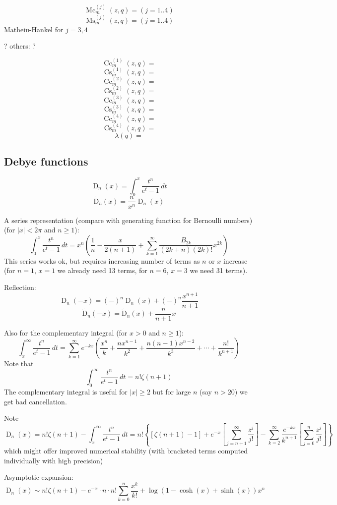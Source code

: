 \documentclass[10pt,dvipdfmx,letterpaper,twoside]{article}
\let\O=\operatorname
\newenvironment{implementation}{\noindent\begin{framed}}{\end{framed}}
\begin{document}
\[ \O{Mc}^{(j)}_m(z,q) = (j=1..4)\]
\[ \O{Ms}^{(j)}_m(z,q) = (j=1..4)\]
Matheiu-Hankel for $j=3,4$

? others: ?

\[ \O{Cc}^{(1)}_m(z,q) = \]
\[ \O{Cs}^{(1)}_m(z,q) = \]
\[ \O{Cc}^{(2)}_m(z,q) = \]
\[ \O{Cs}^{(2)}_m(z,q) = \]
\[ \O{Cc}^{(3)}_m(z,q) = \]
\[ \O{Cs}^{(3)}_m(z,q) = \]
\[ \O{Cc}^{(4)}_m(z,q) = \]
\[ \O{Cs}^{(4)}_m(z,q) = \]
\[ \lambda(q) = \]

\subsection{Debye functions}
\[ \O{D}_n(x) = \int_0^x\frac{t^n}{e^t-1}\,dt \]
\[ \O{\widetilde{D}}_n(x) = \frac{n}{x^n}\O{D}_n(x) \]
\begin{implementation}
A series representation (compare with generating function for Bernoulli numbers) (for $|x|<2\pi$ and $n\geq1$):
\[ \int_0^x\frac{t^n}{e^t-1}\,dt = x^n\left( \frac{1}{n} - \frac{x}{2(n+1)} + \sum_{k=1}^\infty \frac{B_{2k}}{(2k+n)(2k)!}x^{2k}\right) \]
This series works ok, but requires increasing number of terms as $n$ or $x$ increase (for $n=1$, $x=1$ we already need 13 terms, for $n=6$, $x=3$ we need 31 terms).

Reflection:
\[ \O{D}_n(-x) = (-)^n \O{D}_n(x) + (-)^n\frac{x^{n+1}}{n+1} \]
\[ \O{\widetilde{D}}_n(-x) = \O{\widetilde{D}}_n(x) + \frac{n}{n+1}x \]

Also for the complementary integral (for $x>0$ and $n\geq1$):
\[ \int_x^\infty\frac{t^n}{e^t-1}\,dt = \sum_{k=1}^\infty e^{-kx}\left( \frac{x^n}{k} + \frac{n x^{n-1}}{k^2} + \frac{n(n-1)x^{n-2}}{k^3} + \cdots + \frac{n!}{k^{n+1}} \right) \]
Note that
\[ \int_0^\infty\frac{t^n}{e^t-1}\,dt = n!\zeta(n+1) \]
The complementary integral is useful for $|x|\geq2$ but for large $n$ (say $n>20$) we get bad cancellation.

Note
\[ \O{D}_n(x) = n!\zeta(n+1) - \int_x^\infty\frac{t^n}{e^t-1}\,dt = n!\left\{\left[\zeta(n+1)-1\right]
    + e^{-x}\left[\sum_{j=n+1}^\infty\frac{z^j}{j!}\right] - \sum_{k=2}^\infty \frac{e^{-kx}}{k^{n+1}}\left[\sum_{j=0}^n\frac{z^j}{j!}\right] \right\} \]
which might offer improved numerical stability (with bracketed terms computed individually with high precision)

Asymptotic expansion:
\[ \O{D}_n(x) \sim n!\zeta(n+1) - e^{-x}\cdot n\cdot n!\sum_{k=0}^n\frac{x^k}{k!} + \log(1-\cosh(x)+\sinh(x))x^n \]
\end{implementation}
\end{document}
